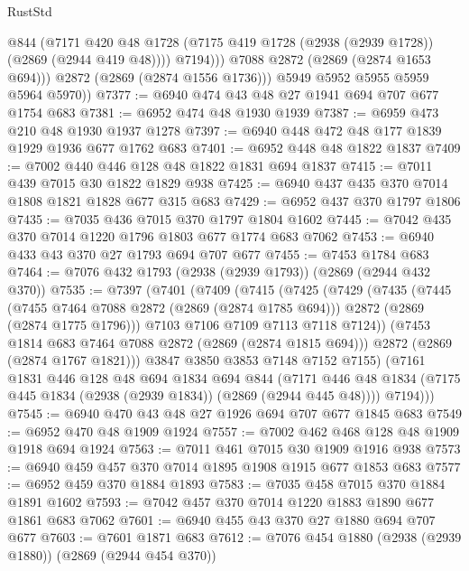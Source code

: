 \begin{lexlean}{RustStd}
\begin{coremodule}
{\begin{coremodule}
{{{{{{{{{{{{                  @844
                  (@7171
                    @420
                    @48
                    @1728
                    (@7175 @419 @1728 (@2938 (@2939 @1728)) (@2869 (@2944 @419 @48))))
                  @7194)))
            @7088
            @2872
            (@2869 (@2874 @1653 @694)))
          @2872
          (@2869 (@2874 @1556 @1736)))
        @5949
        @5952
        @5955
        @5959
        @5964
        @5970))
@7377 := @6940 @474 @43 @48 @27 @1941 @694 @707 @677 @1754 @683
@7381 := @6952 @474 @48 @1930 @1939
@7387 := @6959 @473 @210 @48 @1930 @1937 @1278
@7397 := @6940 @448 @472 @48 @177 @1839 @1929 @1936 @677 @1762 @683
@7401 := @6952 @448 @48 @1822 @1837
@7409 := @7002 @440 @446 @128 @48 @1822 @1831 @694 @1837
@7415 := @7011 @439 @7015 @30 @1822 @1829 @938
@7425 := @6940 @437 @435 @370 @7014 @1808 @1821 @1828 @677 @315 @683
@7429 := @6952 @437 @370 @1797 @1806
@7435 := @7035 @436 @7015 @370 @1797 @1804 @1602
@7445 := @7042 @435 @370 @7014 @1220 @1796 @1803 @677 @1774 @683 @7062
@7453 := @6940 @433 @43 @370 @27 @1793 @694 @707 @677
@7455 := @7453 @1784 @683
@7464 := @7076 @432 @1793 (@2938 (@2939 @1793)) (@2869 (@2944 @432 @370))
@7535 := @7397
    (@7401
      (@7409
        (@7415
          (@7425
            (@7429
              (@7435
                (@7445
                  (@7455 @7464 @7088 @2872 (@2869 (@2874 @1785 @694)))
                  @2872
                  (@2869 (@2874 @1775 @1796)))
                @7103
                @7106
                @7109
                @7113
                @7118
                @7124))
            (@7453 @1814 @683 @7464 @7088 @2872 (@2869 (@2874 @1815 @694)))
            @2872
            (@2869 (@2874 @1767 @1821)))
          @3847
          @3850
          @3853
          @7148
          @7152
          @7155)
        (@7161
          @1831
          @446
          @128
          @48
          @694
          @1834
          @694
          @844
          (@7171 @446 @48 @1834 (@7175 @445 @1834 (@2938 (@2939 @1834)) (@2869 (@2944 @445 @48))))
          @7194)))
@7545 := @6940 @470 @43 @48 @27 @1926 @694 @707 @677 @1845 @683
@7549 := @6952 @470 @48 @1909 @1924
@7557 := @7002 @462 @468 @128 @48 @1909 @1918 @694 @1924
@7563 := @7011 @461 @7015 @30 @1909 @1916 @938
@7573 := @6940 @459 @457 @370 @7014 @1895 @1908 @1915 @677 @1853 @683
@7577 := @6952 @459 @370 @1884 @1893
@7583 := @7035 @458 @7015 @370 @1884 @1891 @1602
@7593 := @7042 @457 @370 @7014 @1220 @1883 @1890 @677 @1861 @683 @7062
@7601 := @6940 @455 @43 @370 @27 @1880 @694 @707 @677
@7603 := @7601 @1871 @683
@7612 := @7076 @454 @1880 (@2938 (@2939 @1880)) (@2869 (@2944 @454 @370))
}}}}}}}}}}}}
\end{coremodule}}
\end{coremodule}
\end{lexlean}
